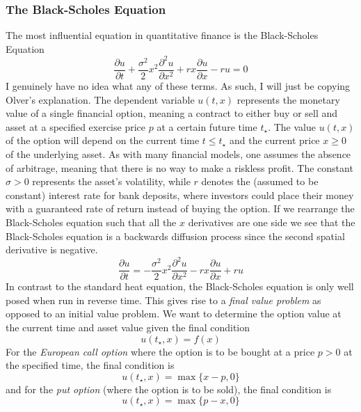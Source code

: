 \documentclass{article}
\newcommand{\pd}[2]{\frac{\partial #1}{\partial #2}}
\newcommand{\pdt}[2]{\frac{\partial ^2 #1}{\partial #2 ^2}}
\numberwithin{equation}{section}
\begin{document}
\subsubsection{The Black-Scholes Equation}
The most influential equation in quantitative finance is the Black-Scholes Equation
\begin{equation}
    \pd{u}{t} +\frac{\sigma^2}{2}x^2\pdt{u}{x}+rx\pd{u}{x} -ru= 0
\end{equation}
I genuinely have no idea what any of these terms. As such, I will just be copying Olver's explanation. The dependent variable $u(t,x)$ represents the monetary value of a single financial option, meaning a contract to either buy or sell and asset at a specified exercise price $p$ at a certain future time $t_\star$. The value $u(t,x)$ of the option will depend on the current time $t\leq t_\star$ and the current price $x\geq0$ of the underlying asset. As with many financial models, one assumes the absence of arbitrage, meaning that there is no way to make a riskless profit. The constant $\sigma>0$ represents the asset's volatility, while $r$ denotes the (assumed to be constant) interest rate for bank deposits, where investors could place their money with a guaranteed rate of return instead of buying the option. If we rearrange the Black-Scholes equation such that all the $x$ derivatives are one side we see that the Black-Scholes equation is a backwards diffusion process since the second spatial derivative is negative. 
\begin{equation}
    \pd{u}{t} = -\frac{\sigma^2}{2}x^2\pdt{u}{x}-rx\pd{u}{x} +ru 
\end{equation}
In contrast to the standard heat equation, the Black-Scholes equation is only well posed when run in reverse time. This gives rise to a \textit{final value problem} as opposed to an initial value problem. We want to determine the option value at the current time and asset value given the final condition
\begin{equation}
    u(t_\star,x) =f(x)
\end{equation}
For the \textit{European call option} where the option is to be bought at a price $p > 0$ at the specified time, the final condition is 
\begin{equation*}
    u(t_\star,x) = \max \{x-p,0\}
\end{equation*}
and for the \textit{put option} (where the option is to be sold), the final condition is 
\begin{equation*}
    u(t_\star,x) = \max \{p-x,0\}
\end{equation*}
\end{document}
